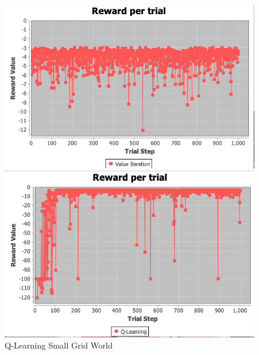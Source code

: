 \documentclass[11pt]{article}
\newcommand{\problemone}{Small Grid World}
\begin{document}
    \begin{figure}
        \begin{minipage}{0.5\textwidth}
            \centering
            \includegraphics[width=1\linewidth]{valueiterationreward.png}
            \caption{Value Iteration \problemone}\label{Fig:Value Iteration \problemone}
        \end{minipage}
        \begin{minipage}{0.5\textwidth}
            \centering
            \includegraphics[width=1\linewidth]{qlearningreward.png}
            \caption{Q-Learning \problemone}\label{Fig:Q-Learning \problemone}
        \end{minipage}
    \end{figure}
\end{document}
